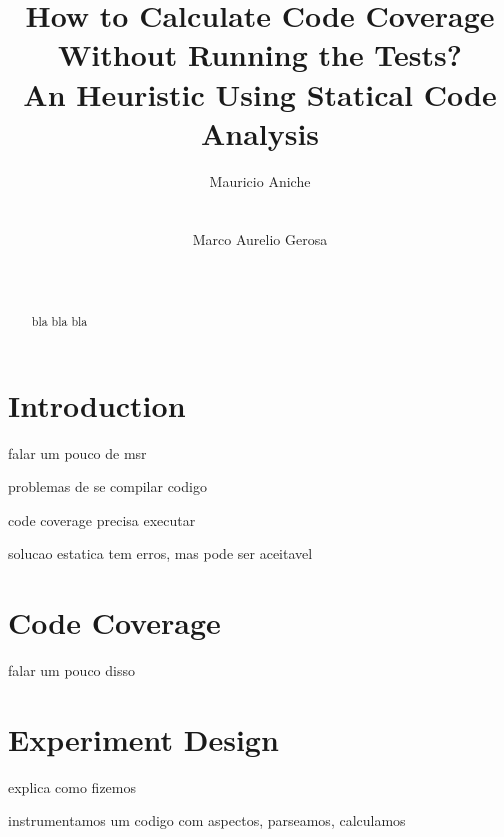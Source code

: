 \documentclass{sig-alternate}
\begin{document}

\title{How to Calculate Code Coverage\\
Without Running the Tests?\\
An Heuristic Using Statical Code Analysis}


\author{
\alignauthor
Mauricio Aniche\\
\\
\\
\alignauthor
Marco Aurelio Gerosa\\
\\
\\
}

\maketitle
\begin{abstract}

bla bla bla

\end{abstract}

\section{Introduction}

falar um pouco de msr

problemas de se compilar codigo

code coverage precisa executar

solucao estatica tem erros, mas pode ser aceitavel

\cite{bowman:reasoning}

\section{Code Coverage}

falar um pouco disso

\section{Experiment Design}

explica como fizemos

instrumentamos um codigo com aspectos, parseamos, calculamos
\end{document}
